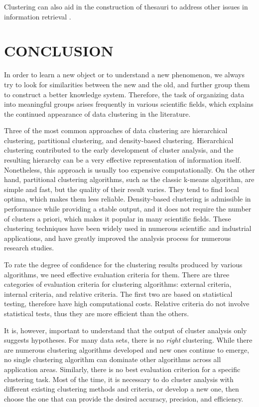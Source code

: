 \documentclass[conference]{IEEEtran}
\begin{document}
Clustering can also aid in the construction of thesauri to address other issues in information retrieval \cite{lin1998automatic}.

\section{CONCLUSION} \label{sec:Conclusion}

In order to learn a new object or to understand a new phenomenon, we always try to look for similarities between the new and the old, and further group them to construct a better knowledge system. Therefore, the task of organizing data into meaningful groups arises frequently in various scientific fields, which explains the continued appearance of data clustering in the literature. 

Three of the most common approaches of data clustering are hierarchical clustering, partitional clustering, and density-based clustering. Hierarchical clustering contributed to the early development of cluster analysis, and the resulting hierarchy can be a very effective representation of information itself. Nonetheless, this approach is usually too expensive computationally. On the other hand, partitional clustering algorithms, such as the classic k-means algorithm, are simple and fast, but the quality of their result varies. They tend to find local optima, which makes them less reliable. Density-based clustering is admissible in performance while providing a stable output, and it does not require the number of clusters a priori, which makes it popular in many scientific fields. These clustering techniques have been widely used in numerous scientific and industrial applications, and have greatly improved the analysis process for numerous research studies.

To rate the degree of confidence for the clustering results produced by various algorithms, we need effective evaluation criteria for them. There are three categories of evaluation criteria for clustering algorithms: external criteria, internal criteria, and relative criteria. The first two are based on statistical testing, therefore have high computational costs. Relative criteria do not involve statistical tests, thus they are more efficient than the others.

It is, however, important to understand that the output of cluster analysis only suggests hypotheses. For many data sets, there is no \textit{right} clustering. While there are numerous clustering algorithms developed and new ones continue to emerge, no single clustering algorithm can dominate other algorithms across all application areas. Similarly, there is no best evaluation criterion for a specific clustering task. Most of the time, it is necessary to do cluster analysis with different existing clustering methods and criteria, or develop a new one, then choose the one that can provide the desired accuracy, precision, and efficiency.
\end{document}
